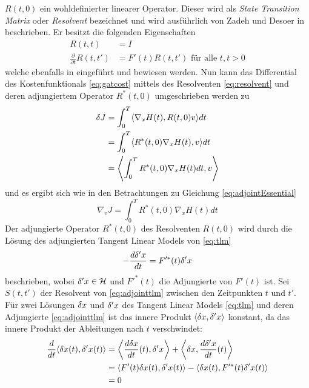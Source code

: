 $R(t,0)$ ein wohldefinierter linearer Operator. Dieser wird als \textit{State Transition Matrix} oder \textit{Resolvent} bezeichnet und wird ausführlich von Zadeh und Desoer in \cite[S. 339 ff.]{zadeh1976linear} beschrieben. Er besitzt die folgenden Eigenschaften
\begin{align}
  R(t,t) &= I \label{eq:resolventPropertiesA}\\
  \frac{\partial}{\partial t}R(t,t') &= F'(t)R(t,t') \text{ für alle } t,t>0\label{eq:resolventPropertiesB}
\end{align}
welche ebenfalls in \cite[S. 339 Theorem 4]{zadeh1976linear} eingeführt und bewiesen werden.
Nun kann das Differential des Kostenfunktionals \eqref{eq:gatcost} mittels des Resolventen \eqref{eq:resolvent} und deren adjungiertem Operator $R^*(t,0)$ umgeschrieben werden zu
\begin{equation*}
\begin{aligned}
 \delta J &= \int_0^T \langle \nabla_x H(t), R(t,0)v\rangle dt \\
	    &= \int_0^T \langle R^*(t,0) \nabla_x H(t), v\rangle dt \\
	    &= \left\langle \int_0^T R^*(t,0) \nabla_x H(t) dt, v\right\rangle \\
\end{aligned}
\end{equation*}
und es ergibt sich wie in den Betrachtungen zu Gleichung \eqref{eq:adjointEssential} %
\begin{equation}
\label{eq:gradCostFunctional}
 \nabla_v J = \int_0^T R^*(t,0) \nabla_x H(t) dt
\end{equation}
Der adjungierte Operator $R^*(t,0)$ des Resolventen $R(t,0)$ wird durch die Lösung des adjungierten Tangent Linear Models von \eqref{eq:tlm} 
\begin{equation}
\label{eq:adjointtlm}
 -\frac{d \delta'x}{dt} = F'^*(t)\delta'x
\end{equation}
beschrieben, wobei $\delta'x \in\mathcal{H}$ und $F'^*(t)$ die Adjungierte von $F'(t)$ ist. 
Sei $S(t,t')$ der Resolvent von \eqref{eq:adjointtlm} zwischen den Zeitpunkten $t$ und $t'$. Für zwei Lösungen $\delta x$ und $\delta' x$ des Tangent Linear Models \eqref{eq:tlm} und deren Adjungierte \eqref{eq:adjointtlm} ist das innere Produkt $\langle \delta x,\delta' x\rangle$ konstant, da das innere Produkt der Ableitungen nach $t$ verschwindet:
\begin{equation}
\begin{aligned}
 \frac{d}{dt}\langle \delta x(t),\delta' x(t)\rangle  &= \left\langle \frac{d \delta x}{dt}(t) ,\delta' x\right\rangle +\left\langle \delta x,\frac{d\delta ' x}{dt}(t)\right\rangle \\
 &= \langle F'(t)\delta x(t),\delta 'x(t)\rangle - \langle \delta x(t),F'^*(t)\delta' x(t)\rangle\\
 &= 0
\end{aligned}
\end{equation}
